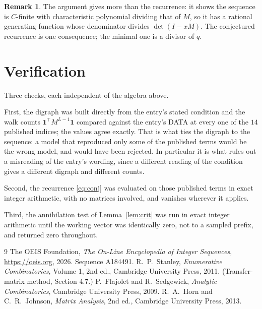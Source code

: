 \documentclass[11pt,a4paper]{article}
\theoremstyle{plain}
\theoremstyle{definition}
\newtheorem{remark}[theorem]{Remark}
\begin{document}
\begin{remark}
The argument gives more than the recurrence: it shows the sequence is $C$-finite with
characteristic polynomial dividing that of $M$, so it has a rational generating function
whose denominator divides $\det(I-xM)$. The conjectured recurrence is one consequence; the
minimal one is a divisor of $q$.
\end{remark}

\section{Verification}

Three checks, each independent of the algebra above.

First, the digraph was built directly from the entry's stated condition and the walk counts
$\mathbf{1}^{\!\top}M^{L-1}\mathbf{1}$ compared against the entry's DATA at
every one of the $14$ published indices; the values agree exactly. That is what ties
the digraph to the sequence: a model that reproduced only some of the published terms would
be the wrong model, and would have been rejected. In particular it is what rules out a
misreading of the entry's wording, since a different reading of the condition gives a
different digraph and different counts.

Second, the recurrence \eqref{eq:conj} was evaluated on those published terms in exact
integer arithmetic, with no matrices involved, and vanishes wherever it applies.

Third, the annihilation test of Lemma~\ref{lem:crit} was run in exact integer arithmetic
until the working vector was identically zero, not to a sampled prefix, and returned zero
throughout.

\begin{thebibliography}{9}
 The OEIS Foundation, \emph{The On-Line Encyclopedia of Integer
Sequences}, \url{https://oeis.org}, 2026. Sequence A184491.
 R.~P.~Stanley, \emph{Enumerative Combinatorics}, Volume 1, 2nd ed.,
Cambridge University Press, 2011. (Transfer-matrix method, Section 4.7.)
 P.~Flajolet and R.~Sedgewick, \emph{Analytic Combinatorics}, Cambridge
University Press, 2009.
 R.~A.~Horn and C.~R.~Johnson, \emph{Matrix Analysis}, 2nd ed., Cambridge
University Press, 2013.
\end{thebibliography}
\end{document}
